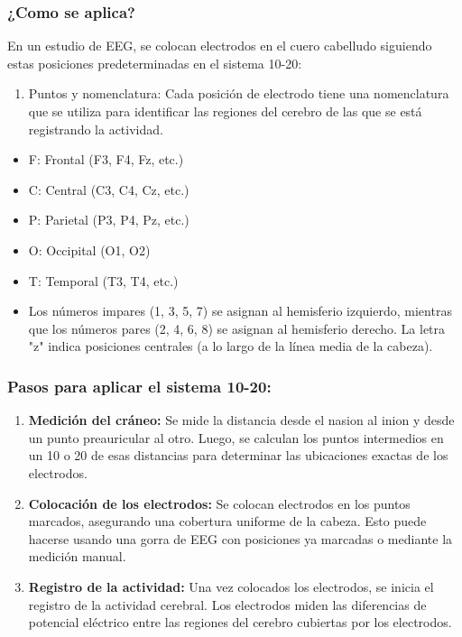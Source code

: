 \documentclass{article}
\begin{document}
\subsubsection{¿Como se aplica?}
En un estudio de EEG, se colocan electrodos en el cuero cabelludo siguiendo estas posiciones predeterminadas en el sistema 10-20:
\begin{enumerate}
    \item Puntos y nomenclatura: Cada posición de electrodo tiene una nomenclatura que se utiliza para identificar las regiones del cerebro de las que se está registrando la actividad.
\end{enumerate}
\begin{itemize}
    \item F: Frontal (F3, F4, Fz, etc.)
    \item C: Central (C3, C4, Cz, etc.)
    \item P: Parietal (P3, P4, Pz, etc.)
    \item O: Occipital (O1, O2)
    \item T: Temporal (T3, T4, etc.)
    \item Los números impares (1, 3, 5, 7) se asignan al hemisferio izquierdo, mientras que los números pares (2, 4, 6, 8) se asignan al hemisferio derecho. La letra "z" indica posiciones centrales (a lo largo de la línea media de la cabeza).
\end{itemize}

\subsubsection{Pasos para aplicar el sistema 10-20:}
\begin{enumerate}
    \item \textbf{Medición del cráneo:} Se mide la distancia desde el nasion al inion y desde un punto preauricular al otro. Luego, se calculan los puntos intermedios en un 10 o 20 de esas distancias para determinar las ubicaciones exactas de los electrodos.
    \item \textbf{Colocación de los electrodos:} Se colocan electrodos en los puntos marcados, asegurando una cobertura uniforme de la cabeza. Esto puede hacerse usando una gorra de EEG con posiciones ya marcadas o mediante la medición manual.
    \item \textbf{Registro de la actividad:} Una vez colocados los electrodos, se inicia el registro de la actividad cerebral. Los electrodos miden las diferencias de potencial eléctrico entre las regiones del cerebro cubiertas por los electrodos.
\end{enumerate}
\end{document}
